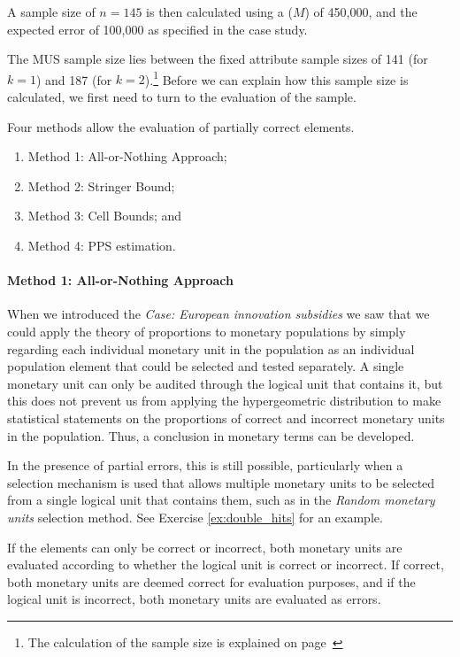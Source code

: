 A sample size of $n = 145$ is then calculated using a  ($M$) of 450,000, and the expected error of 100,000 as specified in the case study.

The MUS sample size lies between the fixed attribute sample sizes of 141 (for $k = 1$) and 187 (for $k = 2$).\footnote{The calculation of the sample size is explained on page~\pageref{par:sample_size_calculation}} Before we can explain how this sample size is calculated, we first need to turn to the evaluation of the sample. 

\bigskip
Four methods allow the evaluation of partially correct elements.
\begin{enumerate}[leftmargin=*,labelsep=.5em]
\item Method 1: All-or-Nothing Approach;
\item Method 2: Stringer Bound; 
\item Method 3: Cell Bounds; and
\item Method 4: PPS estimation.
\end{enumerate}

\paragraph{Method 1: All-or-Nothing Approach} When we introduced the \emph{Case: European innovation subsidies} we saw that we could apply the theory of proportions to monetary populations by simply regarding each individual monetary unit in the population as an individual population element that could be selected and tested separately. A single monetary unit can only be audited through the logical unit that contains it, but this does not prevent us from applying the hypergeometric distribution to make statistical statements on the proportions of correct and incorrect monetary units in the population. Thus, a conclusion in monetary terms can be developed. 

In the presence of partial errors, this is still possible, particularly when a selection mechanism is used that allows multiple monetary units to be selected from a single logical unit that contains them, such as in the \emph{Random monetary units} selection method. See Exercise \ref{ex:double_hits} for an example.

\bigskip
If the elements can only be correct or incorrect, both monetary units are evaluated according to whether the logical unit is correct or incorrect. If correct, both monetary units are deemed correct for evaluation purposes, and if the logical unit is incorrect, both monetary units are evaluated as errors.

